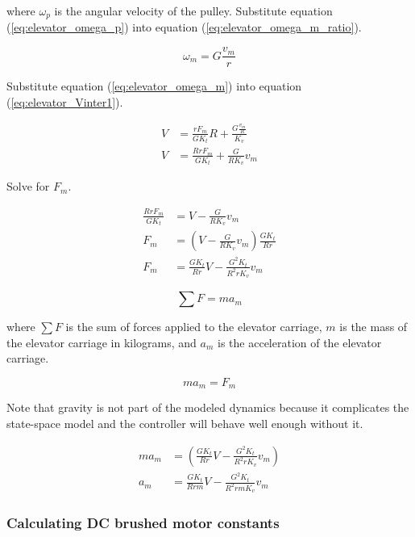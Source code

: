 where $\omega_p$ is the angular velocity of the pulley. Substitute equation
(\ref{eq:elevator_omega_p}) into equation (\ref{eq:elevator_omega_m_ratio}).

\begin{equation}
  \omega_m = G \frac{v_m}{r} \label{eq:elevator_omega_m}
\end{equation}

Substitute equation (\ref{eq:elevator_omega_m}) into equation
(\ref{eq:elevator_Vinter1}).

\begin{align*}
  V &= \frac{rF_m}{GK_t} R + \frac{G \frac{v_m}{R}}{K_v} \\
  V &= \frac{RrF_m}{GK_t} + \frac{G}{RK_v} v_m
\end{align*}

Solve for $F_m$.

\begin{align}
  \frac{RrF_m}{GK_t} &= V - \frac{G}{RK_v} v_m \nonumber \\
  F_m &= \left(V - \frac{G}{RK_v} v_m\right) \frac{GK_t}{Rr} \nonumber \\
  F_m &= \frac{GK_t}{Rr} V - \frac{G^2K_t}{R^2 rK_v} v_m \label{eq:elevator_F_m}
\end{align}

\begin{equation}
  \sum F = ma_m \label{eq:elevator_F_ma}
\end{equation}

where $\sum F$ is the sum of forces applied to the elevator carriage, $m$ is
the mass of the elevator carriage in kilograms, and $a_m$ is the acceleration of
the elevator carriage.

\begin{equation*}
  ma_m = F_m
\end{equation*}

Note that gravity is not part of the modeled dynamics because it complicates the
state-space \gls{model} and the controller will behave well enough without it.

\begin{align}
  ma_m &= \left(\frac{GK_t}{Rr} V - \frac{G^2K_t}{R^2 rK_v} v_m\right)
    \nonumber \\
  a_m &= \frac{GK_t}{Rrm} V - \frac{G^2K_t}{R^2 rmK_v} v_m
    \label{eq:elevator_accel}
\end{align}

\subsubsection{Calculating DC brushed motor constants}

